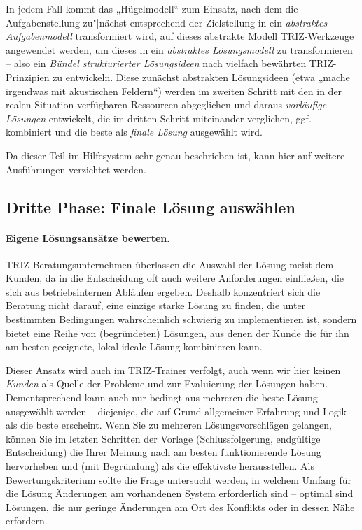\documentclass[11pt,a4paper]{article}
\begin{document}
In jedem Fall kommt das „Hügelmodell“ zum Einsatz, nach dem die
Aufgabenstellung zu"|nächst entsprechend der Zielstellung in ein
\emph{abstraktes Aufgabenmodell} transformiert wird, auf dieses abstrakte
Modell TRIZ-Werkzeuge angewendet werden, um dieses in ein \emph{abstraktes
  Lösungsmodell} zu transformieren -- also ein \emph{Bündel strukturierter
  Lösungsideen} nach vielfach bewährten TRIZ-Prinzipien zu entwickeln.  Diese
zunächst abstrakten Lösungsideen (etwa „mache irgendwas mit akustischen
Feldern“) werden im zweiten Schritt mit den in der realen Situation
verfügbaren Ressourcen abgeglichen und daraus \emph{vorläufige Lösungen}
entwickelt, die im dritten Schritt miteinander verglichen, ggf. kombiniert und
die beste als \emph{finale Lösung} ausgewählt wird.

Da dieser Teil im Hilfesystem sehr genau beschrieben ist, kann hier auf
weitere Ausführungen verzichtet werden. 

\subsection{Dritte Phase: Finale Lösung auswählen}

\paragraph{Eigene Lösungsansätze bewerten.}
TRIZ-Beratungsunternehmen überlassen die Auswahl der Lösung meist dem Kunden,
da in die Entscheidung oft auch weitere Anforderungen einfließen, die sich aus
betriebsinternen Abläufen ergeben.  Deshalb konzentriert sich die Beratung
nicht darauf, eine einzige starke Lösung zu finden, die unter bestimmten
Bedingungen wahrscheinlich schwierig zu implementieren ist, sondern bietet
eine Reihe von (begründeten) Lösungen, aus denen der Kunde die für ihn am
besten geeignete, lokal ideale Lösung kombinieren kann.
 
Dieser Ansatz wird auch im TRIZ-Trainer verfolgt, auch wenn wir hier keinen
\emph{Kunden} als Quelle der Probleme und zur Evaluierung der Lösungen haben.
Dementsprechend kann auch nur bedingt aus mehreren die beste Lösung ausgewählt
werden -- diejenige, die auf Grund allgemeiner Erfahrung und Logik als die
beste erscheint. Wenn Sie zu mehreren Lösungsvorschlägen gelangen, können Sie
im letzten Schritten der Vorlage (Schlussfolgerung, endgültige Entscheidung)
die Ihrer Meinung nach am besten funktionierende Lösung hervorheben und (mit
Begründung) als die effektivste herausstellen.  Als Bewertungskriterium sollte
die Frage untersucht werden, in welchem Umfang für die Lösung Änderungen am
vorhandenen System erforderlich sind -- optimal sind Lösungen, die nur geringe
Änderungen am Ort des Konflikts oder in dessen Nähe erfordern.
\end{document}
